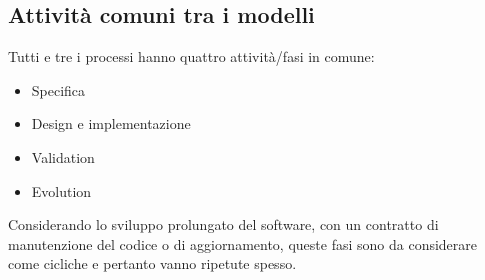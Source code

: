 \subsection{Attività comuni tra i modelli}
Tutti e tre i processi hanno quattro attività/fasi in comune:
\begin{itemize}[noitemsep]
    \item Specifica
    \item Design e implementazione
    \item Validation
    \item Evolution
\end{itemize}
Considerando lo sviluppo prolungato del software, con un contratto di manutenzione del codice o di aggiornamento, queste fasi sono da considerare come cicliche e pertanto vanno ripetute spesso.

